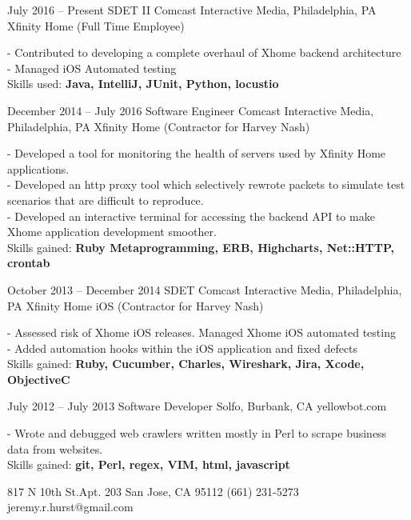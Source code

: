 \documentclass{tccv}
\begin{document}
\begin{eventlist}

\item{July 2016 -- Present}
     {SDET II}
     {Comcast Interactive Media, Philadelphia, PA}
     {Xfinity Home (Full Time Employee)}

- Contributed to developing a complete overhaul of Xhome backend architecture \\
- Managed iOS Automated testing \\
Skills used: \textbf{Java, IntelliJ, JUnit, Python, locustio}

\item{December 2014 -- July 2016}
     {Software Engineer}
     {Comcast Interactive Media, Philadelphia, PA}
     {Xfinity Home (Contractor for Harvey Nash)}

- Developed a tool for monitoring the health of servers used by Xfinity Home applications. \\
- Developed an http proxy tool which selectively rewrote packets to simulate test scenarios that are difficult to reproduce. \\
- Developed an interactive terminal for accessing the backend API to make Xhome application development smoother. \\
Skills gained: \textbf{Ruby Metaprogramming, ERB, Highcharts, Net::HTTP, crontab}

\item{October 2013 -- December 2014}
     {SDET}
     {Comcast Interactive Media, Philadelphia, PA}
     {Xfinity Home iOS (Contractor for Harvey Nash)}

- Assessed risk of Xhome iOS releases. Managed Xhome iOS automated testing \\
- Added automation hooks within the iOS application and fixed defects \\
Skills gained: \textbf{Ruby, Cucumber, Charles, Wireshark, Jira, Xcode, ObjectiveC}

\item{July 2012 -- July 2013}
     {Software Developer}
     {Solfo, Burbank, CA}
     {yellowbot.com}

- Wrote and debugged web crawlers written mostly in Perl to scrape business data from websites. \\
Skills gained: \textbf{git, Perl, regex, VIM, html, javascript}

\end{eventlist}

\personal
    {817 N 10th St.\newline Apt. 203 \newline San Jose, CA 95112}
    {(661) 231-5273}
    {jeremy.r.hurst@gmail.com}
\end{document}
